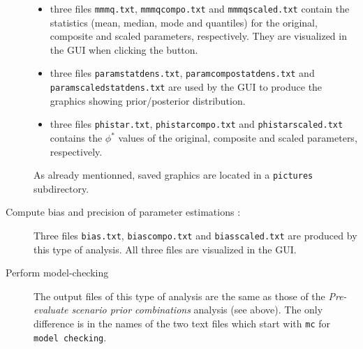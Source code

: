 \begin{description}
  \begin{itemize}
   \item three files \texttt{mmmq.txt}, \texttt{mmmqcompo.txt} and \texttt{mmmqscaled.txt} contain the statistics (mean, median, mode and quantiles) for the original, composite and scaled parameters, respectively. They are visualized in the GUI when clicking the  button. 
   \item three files \texttt{paramstatdens.txt}, \texttt{paramcompostatdens.txt} and \texttt{paramscaledstatdens.txt} are used by the GUI to produce the graphics showing prior/posterior distribution.
   \item three files \texttt{phistar.txt}, \texttt{phistarcompo.txt} and \texttt{phistarscaled.txt} contains the $\phi^*$ values of the original, composite and scaled parameters, respectively.
  \end{itemize}
As already mentionned, saved graphics are located in a \texttt{pictures} subdirectory.
 \item [Compute bias and precision of parameter estimations :] Three files \texttt{bias.txt}, \texttt{biascompo.txt} and \texttt{biasscaled.txt} are produced by this type of analysis. All three files are visualized in the GUI. 
 \item [Perform model-checking] The output files of this type of analysis are the same as those of the \textit{Pre-evaluate scenario prior combinations} analysis (see above). The only difference is in the names of the two text files which start with \texttt{mc} for \texttt{model checking}. 
\end{description}
~\\

